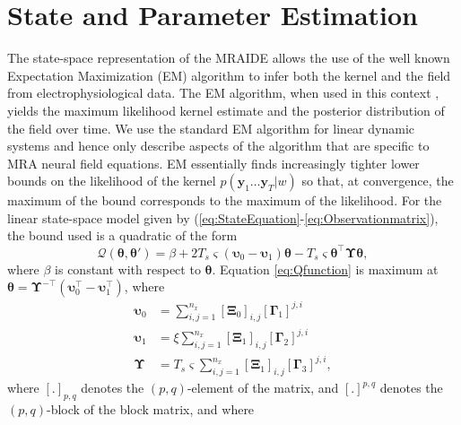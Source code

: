 \documentclass[journal]{IEEEtran}
\begin{document}
\section{State and Parameter Estimation}
The state-space representation of the MRAIDE allows the use of the well known Expectation Maximization (EM) algorithm \cite{Dempster1977} to infer both the kernel and the field from electrophysiological data. The EM algorithm, when used in this context \cite{Dewar2009}, yields the maximum likelihood kernel estimate and the posterior distribution of the field over time. We use the standard EM algorithm for linear dynamic systems \cite{Shumway2000} and hence only describe aspects of the algorithm that are specific to MRA neural field equations. EM essentially finds increasingly tighter lower bounds on the likelihood of the kernel $p(\mathbf{y}_1 \ldots \mathbf{y}_T|w)$ so that, at convergence, the maximum of the bound corresponds to the maximum of the likelihood. For the linear state-space model given by (\ref{eq:StateEquation}-\ref{eq:Observationmatrix}), the bound used is a quadratic of the form
\begin{equation}\label{eq:Qfunction}
 \mathcal Q\left(\boldsymbol \theta,\boldsymbol\theta'\right)=\beta+2T_s\varsigma\left(\boldsymbol\upsilon_0-\boldsymbol\upsilon_1\right)\boldsymbol\theta-T_s\varsigma\boldsymbol\theta^\top\boldsymbol\Upsilon\boldsymbol\theta,
\end{equation}
where $\beta$ is constant with respect to $\boldsymbol\theta$. Equation \eqref{eq:Qfunction} is maximum at $\boldsymbol \theta= \boldsymbol\Upsilon^{-\top}(\boldsymbol\upsilon_0^\top-\boldsymbol\upsilon_1^\top)$, where
\begin{align}\label{eq:upsilon0}
 \boldsymbol\upsilon_0 & =\sum_{i,j=1}^{n_x}[\boldsymbol\Xi_0]_{i,j}[\boldsymbol\Gamma_1]^{j,i} \\ 
 \boldsymbol\upsilon_1 & =\xi\sum_{i,j=1}^{n_x}[\boldsymbol\Xi_1]_{i,j}[\boldsymbol\Gamma_2]^{j,i} \label{eq:upsilon1}\\
 \boldsymbol\Upsilon&=T_s\varsigma\sum_{i,j=1}^{n_x}[\boldsymbol\Xi_1]_{i,j}[\boldsymbol\Gamma_3]^{j,i},\label{eq:Upsilon}
\end{align}
where $[.]_{p,q}$ denotes the $\left(p,q\right)$-element of the matrix, and $ [.]^{p,q}$ denotes the $\left(p,q\right)$-block of the block matrix, and where
\end{document}

